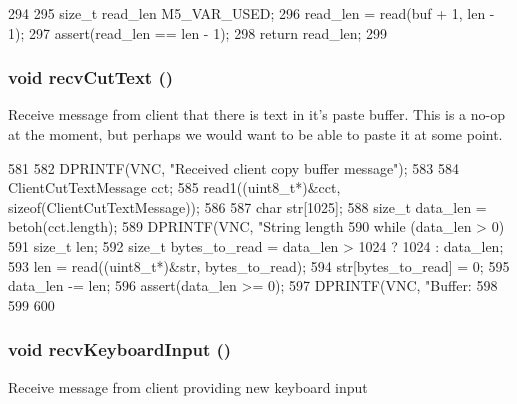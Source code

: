 \begin{DoxyCode}
294 {
295     size_t read_len M5_VAR_USED;
296     read_len = read(buf + 1, len - 1);
297     assert(read_len == len - 1);
298     return read_len;
299 }
\end{DoxyCode}
\hypertarget{classVncServer_a7ee4399f42b127e68135272ff77815c2}{
\subsubsection[{recvCutText}]{\setlength{\rightskip}{0pt plus 5cm}void recvCutText ()}}
\label{classVncServer_a7ee4399f42b127e68135272ff77815c2}
Receive message from client that there is text in it's paste buffer. This is a no-\/op at the moment, but perhaps we would want to be able to paste it at some point. 


\begin{DoxyCode}
581 {
582     DPRINTF(VNC, "Received client copy buffer message\n");
583 
584     ClientCutTextMessage cct;
585     read1((uint8_t*)&cct, sizeof(ClientCutTextMessage));
586 
587     char str[1025];
588     size_t data_len = betoh(cct.length);
589     DPRINTF(VNC, "String length %
590     while (data_len > 0) {
591         size_t len;
592         size_t bytes_to_read = data_len > 1024 ? 1024 : data_len;
593         len = read((uint8_t*)&str, bytes_to_read);
594         str[bytes_to_read] = 0;
595         data_len -= len;
596         assert(data_len >= 0);
597         DPRINTF(VNC, "Buffer: %
598     }
599 
600 }
\end{DoxyCode}
\hypertarget{classVncServer_adce913e2d5283f60780d7becd1d3e44b}{
\subsubsection[{recvKeyboardInput}]{\setlength{\rightskip}{0pt plus 5cm}void recvKeyboardInput ()}}
\label{classVncServer_adce913e2d5283f60780d7becd1d3e44b}
Receive message from client providing new keyboard input 


